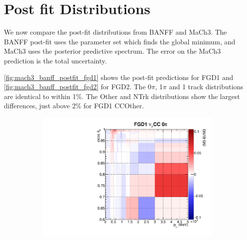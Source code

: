 \section{Post fit Distributions}
We now compare the post-fit \pmu distributions from BANFF and MaCh3. The BANFF post-fit uses the parameter set which finds the global minimum, and MaCh3 uses the posterior predictive spectrum. The error on the MaCh3 prediction is the total uncertainty.

\autoref{fig:mach3_banff_postfit_fgd1} shows the post-fit predictions for FGD1 and \autoref{fig:mach3_banff_postfit_fgd2} for FGD2. The 0$\pi$, 1$\pi$ and 1 track distributions are identical to within 1\%. The Other and NTrk distributions show the largest differences, just above 2\% for FGD1 CCOther.
\begin{figure}
	\begin{subfigure}[t]{0.10\textwidth}
		\includegraphics[width=\textwidth, trim={0mm 0mm 0mm 0mm}, clip, page=2]{figures/mach3/banff/postfit_comp}
	\end{subfigure}
	

\end{figure}
